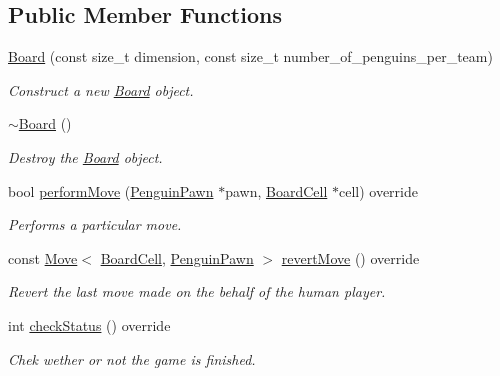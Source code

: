 \subsection*{Public Member Functions}
\begin{DoxyCompactItemize}
\item 
\hyperlink{classgame_1_1penguin_1_1_board_aea5bd314dbc295e71759baf2051409c5}{Board} (const size\+\_\+t dimension, const size\+\_\+t number\+\_\+of\+\_\+penguins\+\_\+per\+\_\+team)
\begin{DoxyCompactList}\small\item\em Construct a new \hyperlink{classgame_1_1penguin_1_1_board}{Board} object. \end{DoxyCompactList}\item 
\hyperlink{classgame_1_1penguin_1_1_board_a7768c6b6dab42e72a3f3853af2ad1f5a}{$\sim$\+Board} ()
\begin{DoxyCompactList}\small\item\em Destroy the \hyperlink{classgame_1_1penguin_1_1_board}{Board} object. \end{DoxyCompactList}\item 
bool \hyperlink{classgame_1_1penguin_1_1_board_af297dc572afb02dafc61e3b8e849338f}{perform\+Move} (\hyperlink{classgame_1_1penguin_1_1_penguin_pawn}{Penguin\+Pawn} $\ast$pawn, \hyperlink{classgame_1_1penguin_1_1_board_cell}{Board\+Cell} $\ast$cell) override
\begin{DoxyCompactList}\small\item\em Performs a particular move. \end{DoxyCompactList}\item 
const \hyperlink{structgame_1_1_move}{Move}$<$ \hyperlink{classgame_1_1penguin_1_1_board_cell}{Board\+Cell}, \hyperlink{classgame_1_1penguin_1_1_penguin_pawn}{Penguin\+Pawn} $>$ \hyperlink{classgame_1_1penguin_1_1_board_a45ecb5bba50b4d03592ac4ddf9255b49}{revert\+Move} () override
\begin{DoxyCompactList}\small\item\em Revert the last move made on the behalf of the human player. \end{DoxyCompactList}\item 
int \hyperlink{classgame_1_1penguin_1_1_board_a3d659743bc33b43168c82dc4e2d3b00e}{check\+Status} () override
\begin{DoxyCompactList}\small\item\em Chek wether or not the game is finished. \end{DoxyCompactList}\item 

\end{DoxyCompactItemize}
